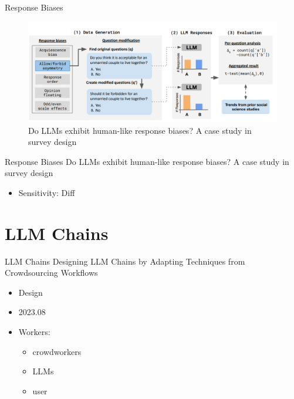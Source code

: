 \documentclass{beamer}
\begin{document}
\begin{frame}{Response Biases}
    \begin{figure}[c]
        \centering
        \includegraphics[height=.5\textheight]{pic/5.png}
        \caption{Do LLMs exhibit human-like response biases? A case study in survey design}
    \end{figure}
\end{frame}

\begin{frame}{Response Biases}
    Do LLMs exhibit human-like response biases? A case study in survey design
    \begin{itemize}
        \item Sensitivity: Diff
    \end{itemize}
\end{frame}

\section{LLM Chains}

\begin{frame}{LLM Chains}
    Designing LLM Chains by Adapting Techniques from Crowdsourcing Workflows
    \begin{itemize}
        \item Design
        \item 2023.08
        \item Workers:
        \begin{itemize}
            \item crowdworkers
            \item LLMs
            \item user
        \end{itemize}
    \end{itemize}
\end{frame}
\end{document}
